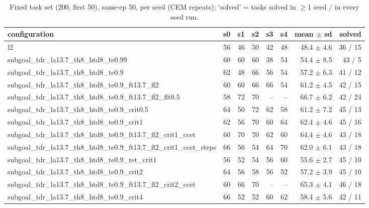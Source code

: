 \begin{table}[H]
\centering\small
\caption{Fixed task set (200, first 50), same-ep 50, per seed (CEM repeats); `solved' = tasks solved in $\ge$1 seed / in every seed run.}
\label{tab:gas-mpc-pooled-same50-task200-n50}
\begin{tabular}{lrrrrrrr}
\toprule
configuration & s0 & s1 & s2 & s3 & s4 & mean $\pm$ sd & solved \\
\midrule
l2 & 56 & 46 & 50 & 42 & 48 & 48.4 $\pm$ 4.6 & 36 / 15 \\
subgoal\_tdr\_la13.7\_th8\_htd8\_te0.99 & 60 & 60 & 60 & 38 & 54 & 54.4 $\pm$ 8.5 & 43 / 5 \\
subgoal\_tdr\_la13.7\_th8\_htd8\_te0.9 & 62 & 48 & 66 & 56 & 54 & 57.2 $\pm$ 6.3 & 41 / 12 \\
subgoal\_tdr\_la13.7\_th8\_htd8\_te0.9\_ft13.7\_fl2 & 60 & 60 & 66 & 66 & 54 & 61.2 $\pm$ 4.5 & 42 / 15 \\
subgoal\_tdr\_la13.7\_th8\_htd8\_te0.9\_ft13.7\_fl2\_flt0.5 & 58 & 72 & 70 & -- & -- & 66.7 $\pm$ 6.2 & 42 / 24 \\
subgoal\_tdr\_la13.7\_th8\_htd8\_te0.9\_crit0.5 & 64 & 50 & 72 & 62 & 58 & 61.2 $\pm$ 7.2 & 45 / 13 \\
subgoal\_tdr\_la13.7\_th8\_htd8\_te0.9\_crit1 & 62 & 56 & 70 & 60 & 64 & 62.4 $\pm$ 4.6 & 45 / 16 \\
subgoal\_tdr\_la13.7\_th8\_htd8\_te0.9\_ft13.7\_fl2\_crit1\_ccet & 60 & 70 & 70 & 62 & 60 & 64.4 $\pm$ 4.6 & 43 / 18 \\
subgoal\_tdr\_la13.7\_th8\_htd8\_te0.9\_ft13.7\_fl2\_crit1\_ccet\_steps & 66 & 56 & 54 & 64 & 70 & 62.0 $\pm$ 6.1 & 43 / 18 \\
subgoal\_tdr\_la13.7\_th8\_htd8\_te0.9\_ret\_crit1 & 56 & 52 & 54 & 56 & 60 & 55.6 $\pm$ 2.7 & 45 / 10 \\
subgoal\_tdr\_la13.7\_th8\_htd8\_te0.9\_crit2 & 64 & 56 & 58 & 56 & 52 & 57.2 $\pm$ 3.9 & 45 / 10 \\
subgoal\_tdr\_la13.7\_th8\_htd8\_te0.9\_ft13.7\_fl2\_crit2\_ccet & 60 & 66 & 70 & -- & -- & 65.3 $\pm$ 4.1 & 46 / 18 \\
subgoal\_tdr\_la13.7\_th8\_htd8\_te0.9\_crit4 & 66 & 52 & 52 & 60 & 62 & 58.4 $\pm$ 5.6 & 42 / 11 \\
\bottomrule
\end{tabular}
\end{table}

